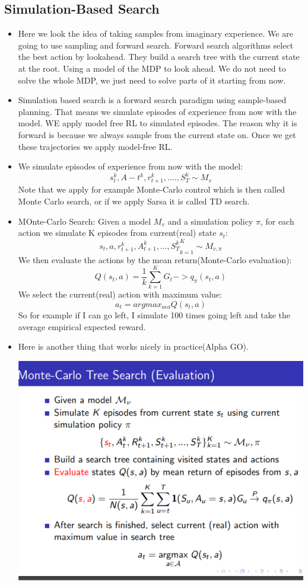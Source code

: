 \documentclass[a4paper]{article}
\begin{document}
\subsection{Simulation-Based Search}
\begin{itemize}
    \item Here we look the idea of taking samples from imaginary experience. We are going to use sampling and forward search.
     Forward search algorithms select the best action by lookahead. They build a search tree with the current state at the root. Using a model of the MDP to look ahead. We do not need to solve the whole MDP, we just need to solve parts of it starting from now. 
    \item Simulation based search is a forward search paradigm using sample-based planning. That means we simulate episodes of experience from now with the model. WE apply model free RL to simulated episodes. The reason why it is forward is because we always sample from the current state on. Once we get these trajectories we apply model-free RL. 
    \item We simulate episodes of experience from now with the model: $${s_t^k, A-t^k, r_{t+1}^k,....,S_T^k} \sim M_v$$
    Note that we apply for example Monte-Carlo control which is then called Monte Carlo search, or if we apply Sarsa it is called TD search. 
    \item MOnte-Carlo Search: Given a model $M_v$ and a simulation policy $\pi$, for each action we simulate K episodes from current(real) state $s_t$: $${s_t, a, r_{t+1}^k, A_{t+1}^k, ..., S_T^k}_{k=1}^K \sim M_{v,\pi}$$
    We then evaluate the actions by the mean return(Monte-Carlo evaluation): $$Q(s_t, a) = \frac{1}{k} \sum_{k=1}^K G_t -> q_{\pi}(s_t,a)$$
    We select the current(real) action with maximum value: 
    $$a_t = argmax_{a \epsilon a}Q(s_t,a)$$
    \newline
    So for example if I can go left, I simulate 100 times going left and take the average empirical expected reward. 
    \item Here is another thing that works nicely in practice(Alpha GO).     \begin{center}
    \includegraphics[width = \textwidth]{images/treesearch.png}

\end{center}
\end{itemize}
\end{document}
